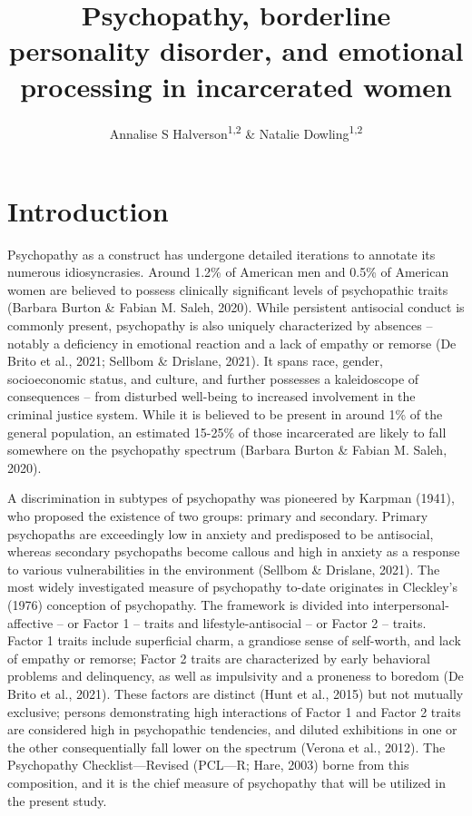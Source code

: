 \documentclass[
  man,floatsintext]{apa7}
\title{Psychopathy, borderline personality disorder, and emotional processing in incarcerated women}
\author{Annalise S Halverson\textsuperscript{1,2} \& Natalie Dowling\textsuperscript{1,2}}
\date{}
\affiliation{\vspace{0.5cm}\textsuperscript{1} University of Chicago\\\textsuperscript{2} Department of Psychology}
\begin{document}
\maketitle

\hypertarget{introduction}{%
\section{Introduction}\label{introduction}}

Psychopathy as a construct has undergone detailed iterations to annotate its numerous idiosyncrasies. Around 1.2\% of American men and 0.5\% of American women are believed to possess clinically significant levels of psychopathic traits (Barbara Burton \& Fabian M. Saleh, 2020). While persistent antisocial conduct is commonly present, psychopathy is also uniquely characterized by absences -- notably a deficiency in emotional reaction and a lack of empathy or remorse (De Brito et al., 2021; Sellbom \& Drislane, 2021). It spans race, gender, socioeconomic status, and culture, and further possesses a kaleidoscope of consequences -- from disturbed well-being to increased involvement in the criminal justice system. While it is believed to be present in around 1\% of the general population, an estimated 15-25\% of those incarcerated are likely to fall somewhere on the psychopathy spectrum (Barbara Burton \& Fabian M. Saleh, 2020).

A discrimination in subtypes of psychopathy was pioneered by Karpman (1941), who proposed the existence of two groups: primary and secondary. Primary psychopaths are exceedingly low in anxiety and predisposed to be antisocial, whereas secondary psychopaths become callous and high in anxiety as a response to various vulnerabilities in the environment (Sellbom \& Drislane, 2021). The most widely investigated measure of psychopathy to-date originates in Cleckley's (1976) conception of psychopathy. The framework is divided into interpersonal-affective -- or Factor 1 -- traits and lifestyle-antisocial -- or Factor 2 -- traits. Factor 1 traits include superficial charm, a grandiose sense of self-worth, and lack of empathy or remorse; Factor 2 traits are characterized by early behavioral problems and delinquency, as well as impulsivity and a proneness to boredom (De Brito et al., 2021). These factors are distinct (Hunt et al., 2015) but not mutually exclusive; persons demonstrating high interactions of Factor 1 and Factor 2 traits are considered high in psychopathic tendencies, and diluted exhibitions in one or the other consequentially fall lower on the spectrum (Verona et al., 2012). The Psychopathy Checklist---Revised (PCL---R; Hare, 2003) borne from this composition, and it is the chief measure of psychopathy that will be utilized in the present study.
\end{document}
